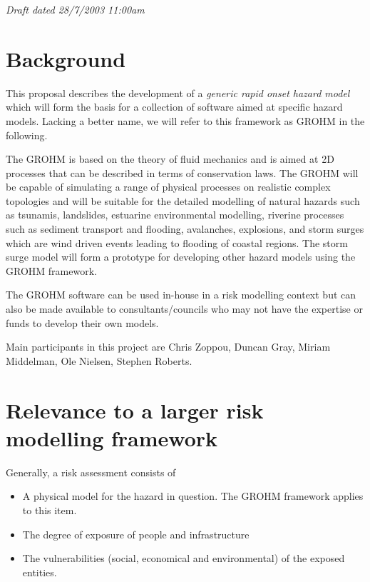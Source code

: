 \documentclass{article}
\begin{document}

\medskip
\textit{Draft dated 28/7/2003 11:00am}


\section{Background}

This proposal describes the development of a \textit{generic rapid
onset hazard model} which will form the basis for a collection of
software aimed at specific hazard models. Lacking a better name, we
will refer to this framework as GROHM in the following.

The GROHM is based on the theory of fluid mechanics and is aimed at 2D
processes that can be described in terms of conservation laws. The
GROHM will be capable of simulating a range of physical processes on
realistic complex topologies and will be suitable for the detailed
modelling of natural hazards such as tsunamis, landslides, estuarine
environmental modelling, riverine processes
such as sediment transport and flooding, avalanches, explosions, and 
storm surges which are wind driven events leading to flooding of
coastal regions. The storm surge model will form a prototype for
developing other hazard models using the GROHM framework.


The GROHM software can be used in-house in a risk modelling context but can
also be made available to consultants/councils who may not
have the expertise or funds to develop their own models.

Main participants in this project are 
Chris Zoppou, Duncan Gray, Miriam Middelman, Ole Nielsen, Stephen Roberts.

\section{Relevance to a larger risk modelling framework}


Generally, a risk assessment consists of
\begin{itemize}
  \item A physical model for the hazard in question.
  The GROHM framework applies to this item.
  \item The degree of exposure of people and infrastructure
  \item The vulnerabilities (social, economical and environmental)
  of the exposed entities.
\end{itemize}
\end{document}
